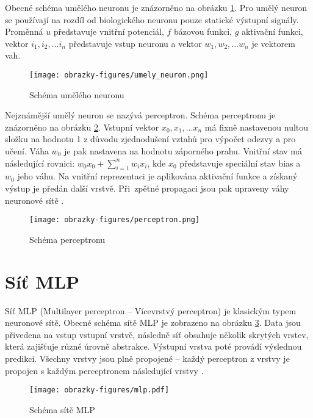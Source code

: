 Obecné schéma umělého neuronu je znázorněno na obrázku \ref{fig:umelyneuron}. Pro umělý neuron se používají na rozdíl od biologického neuronu pouze statické výstupní signály. Proměnná $u$ představuje vnitřní potenciál, $f$ bázovou funkci, $g$ aktivační funkci, vektor $i_1, i_2,\ldots i_n$ představuje vstup neuronu a vektor $w_1, w_2,\ldots w_n$ je vektorem vah. 

\begin{figure}[!htbp]
    \centering
    \texttt{[image: obrazky-figures/umely\_neuron.png]}
    \caption{Schéma umělého neuronu \cite{IZULecture}}
    \label{fig:umelyneuron}
\end{figure}


Nejznámější umělý neuron se nazývá perceptron. Schéma perceptronu je znázorněno na obrázku \ref{fig:perceptron}. Vstupní vektor $x_0, x_1,\ldots x_n$ má fixně nastavenou nultou složku na hodnotu 1 z důvodu zjednodušení vztahů pro výpočet odezvy a pro učení. Váha $w_0$ je pak nastavena na hodnotu záporného prahu. Vnitřní stav má následující rovnici: $w_0x_0 + \sum_{i=1}^{n}w_ix_i$, kde $x_0$ představuje speciální stav bias a $w_0$ jeho váhu. Na vnitřní reprezentaci je aplikována aktivační funkce a získaný výstup je předán další vrstvě. Při~zpětné propagaci jsou pak upraveny váhy neuronové sítě \cite{IZULecture}.

\begin{figure}[!htbp]
    \centering
    \texttt{[image: obrazky-figures/perceptron.png]}
    \caption{Schéma perceptronu \cite{IZULecture}}
    \label{fig:perceptron}
\end{figure}

\section{Síť MLP}
\label{section:MLP}
Síť MLP (Multilayer perceptron -- Vícevrstvý perceptron) je klasickým typem neuronové sítě. Obecné schéma sítě MLP je zobrazeno na obrázku \ref{fig:mlp}. Data jsou přivedena na vstup vstupní vrstvě, následně síť obsahuje několik skrytých vrstev, která zajišťuje různé úrovně abstrakce. Výstupní vrstva poté provádí výslednou predikci. Všechny vrstvy jsou plně propojené -- každý perceptron z vrstvy je propojen s každým perceptronem následující vrstvy \cite{WhenToUseMLPCNN}.

\begin{figure}[!htbp]
    \centering
    \texttt{[image: obrazky-figures/mlp.pdf]}
    \caption{Schéma sítě MLP}
    \label{fig:mlp}
\end{figure}


